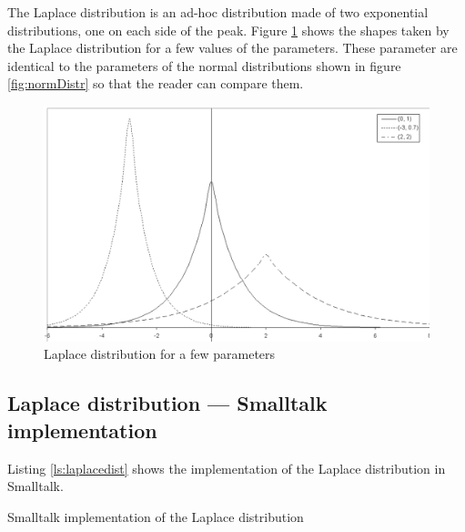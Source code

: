 \documentclass[twoside]{book}
\begin{document}
The Laplace distribution is an ad-hoc distribution made of two
exponential distributions, one on each side of the peak. Figure
\ref{fig:laplaceDistr} shows the shapes taken by the Laplace
distribution for a few values of the parameters. These parameter
are identical to the parameters of the normal distributions shown
in figure \ref{fig:normDistr} so that the reader can compare them.
\begin{figure}
\centering\includegraphics[width=12cm]{Figures/LaplaceDistribution}
\caption{Laplace distribution for a few
parameters}\label{fig:laplaceDistr}
\end{figure}

\subsection{Laplace distribution --- Smalltalk  implementation}
Listing \ref{ls:laplacedist} shows the implementation of the
Laplace distribution in Smalltalk.

\begin{listing} Smalltalk implementation of the Laplace distribution \label{ls:laplacedist}

\end{listing}
\end{document}

